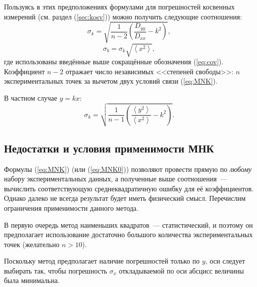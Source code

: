 Пользуясь в этих предположениях формулами для погрешностей косвенных
измерений (см. раздел (\ref{sec:kosv})) можно получить следующие
соотношения:
\begin{equation}
    \sigma_{k}=\sqrt{\frac{1}{n-2}\left(\frac{D_{yy}}{D_{xx}}-k^{2}\right)},
    \label{eq:MNK_sigma_k}
\end{equation}
\begin{equation}
    \sigma_{b}=\sigma_{k}\sqrt{\left\langle x^{2}\right\rangle
    },\label{eq:MNK_sigma_b}
\end{equation}
где использованы введённые выше сокращённые обозначения (\ref{eq:cov}).
Коэффициент $n-2$ отражает число независимых <<степеней
свободы>>: $n$ экспериментальных точек за вычетом двух
условий связи (\ref{eq:MNK}).

В частном случае $y=kx$:
\begin{equation}
\sigma_{k}=\sqrt{\frac{1}{n-1}\left(\frac{\left\langle y^{2}\right\rangle
}{\left\langle x^{2}\right\rangle }-k^{2}\right)}.\label{eq:MNK_sigma0}
\end{equation}


\subsection{Недостатки и условия применимости МНК}\label{sec:MNKdefect}

Формулы (\ref{eq:MNK}) (или (\ref{eq:MNK0})) позволяют провести
прямую по \emph{любому} набору экспериментальных данных, а полученные
выше соотношения~--- вычислить
соответствующую среднеквадратичную ошибку для её коэффициентов. Однако
далеко не всегда результат будет иметь физический смысл. Перечислим
ограничения применимости данного метода.


В первую очередь метод наименьших квадратов~--- статистический,
и поэтому он предполагает использование достаточно большого количества
экспериментальных точек (желательно $n>10$).

Поскольку метод предполагает наличие погрешностей только по $y$,
оси следует выбирать так, чтобы погрешность $\sigma_{x}$ откладываемой
по оси абсцисс величины была минимальна.

